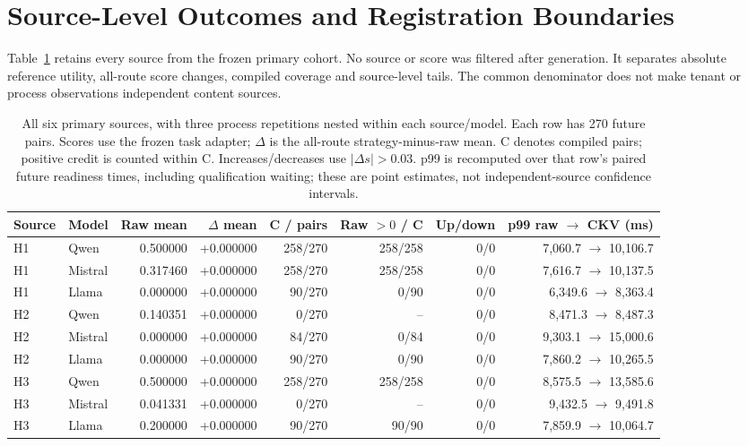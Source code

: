 \section{Source-Level Outcomes and Registration Boundaries}
\label{sec:s-audit}
Table~\ref{tab:s-source-results} retains every source from the frozen primary cohort. No source or score was filtered after generation. It separates absolute reference utility, all-route score changes, compiled coverage and source-level tails. The common denominator does not make tenant or process observations independent content sources.

\begin{table}[t]
\centering\small
\caption{All six primary sources, with three process repetitions nested within each source/model. Each row has 270 future pairs. Scores use the frozen task adapter; $\Delta$ is the all-route strategy-minus-raw mean. C denotes compiled pairs; positive credit is counted within C. Increases/decreases use $|\Delta s|>0.03$. p99 is recomputed over that row's paired future readiness times, including qualification waiting; these are point estimates, not independent-source confidence intervals.}
\label{tab:s-source-results}
\begin{tabular}{@{}llrrrrrr@{}}
\toprule
Source & Model & Raw mean & $\Delta$ mean & C / pairs & Raw $>0$ / C & Up/down & p99 raw $\rightarrow$ CKV (ms)\\
\midrule
H1 & Qwen & 0.500000 & +0.000000 & 258/270 & 258/258 & 0/0 & 7,060.7 $\rightarrow$ 10,106.7\\
H1 & Mistral & 0.317460 & +0.000000 & 258/270 & 258/258 & 0/0 & 7,616.7 $\rightarrow$ 10,137.5\\
H1 & Llama & 0.000000 & +0.000000 & 90/270 & 0/90 & 0/0 & 6,349.6 $\rightarrow$ 8,363.4\\
H2 & Qwen & 0.140351 & +0.000000 & 0/270 & -- & 0/0 & 8,471.3 $\rightarrow$ 8,487.3\\
H2 & Mistral & 0.000000 & +0.000000 & 84/270 & 0/84 & 0/0 & 9,303.1 $\rightarrow$ 15,000.6\\
H2 & Llama & 0.000000 & +0.000000 & 90/270 & 0/90 & 0/0 & 7,860.2 $\rightarrow$ 10,265.5\\
H3 & Qwen & 0.500000 & +0.000000 & 258/270 & 258/258 & 0/0 & 8,575.5 $\rightarrow$ 13,585.6\\
H3 & Mistral & 0.041331 & +0.000000 & 0/270 & -- & 0/0 & 9,432.5 $\rightarrow$ 9,491.8\\
H3 & Llama & 0.200000 & +0.000000 & 90/270 & 90/90 & 0/0 & 7,859.9 $\rightarrow$ 10,064.7\\

\end{tabular}
\end{table}
